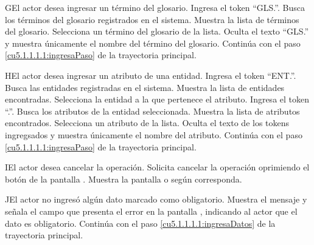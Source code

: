  \begin{UCtrayectoriaA}{G}{El actor desea ingresar un término del glosario.}
 	\UCpaso[\UCactor] Ingresa el token ``GLS.''.	
 	\UCpaso[\UCsist] Busca los términos del glosario registrados en el sistema. 
 	\UCpaso[\UCsist] Muestra la lista de términos del glosario.
 	\UCpaso[\UCactor] Selecciona un término del glosario de la lista.
  	\UCpaso[\UCsist] Oculta el texto ``GLS.'' y muestra únicamente el nombre del término del glosario.
    \UCpaso[] Continúa con el paso \ref{cu5.1.1.1.1:ingresaPaso} de la trayectoria principal.
 \end{UCtrayectoriaA}

 \begin{UCtrayectoriaA}{H}{El actor desea ingresar un atributo de una entidad.}
 	\UCpaso[\UCactor] Ingresa el token ``ENT.''.
 	\UCpaso[\UCsist] Busca las entidades registradas en el sistema. 
 	\UCpaso[\UCsist] Muestra la lista de entidades encontradas.
 	\UCpaso[\UCactor] Selecciona la entidad a la que pertenece el atributo.
  	\UCpaso[\UCactor] Ingresa el token ``.''.
  	\UCpaso[\UCsist] Busca los atributos de la entidad seleccionada.
  	\UCpaso[\UCsist] Muestra la lista de atributos encontrados.
 	\UCpaso[\UCactor] Selecciona un atributo de la lista.
  	\UCpaso[\UCsist] Oculta el texto de los tokens ingregsados y muestra únicamente el nombre del atributo.
    \UCpaso[] Continúa con el paso \ref{cu5.1.1.1.1:ingresaPaso} de la trayectoria principal.
 \end{UCtrayectoriaA}


 \begin{UCtrayectoriaA}{I}{El actor desea cancelar la operación.}
    \UCpaso[\UCactor] Solicita cancelar la operación oprimiendo el botón  de la pantalla .
    \UCpaso[\UCsist] Muestra la pantalla  o  según corresponda.
 \end{UCtrayectoriaA}
 
 \begin{UCtrayectoriaA}{J}{El actor no ingresó algún dato marcado como obligatorio.}
    \UCpaso[\UCsist] Muestra el mensaje  y señala el campo que presenta el error en la pantalla 
	    , indicando al actor que el dato es obligatorio.
    \UCpaso[] Continúa con el paso \ref{cu5.1.1.1.1:ingresaDatos} de la trayectoria principal.
 \end{UCtrayectoriaA}
 
